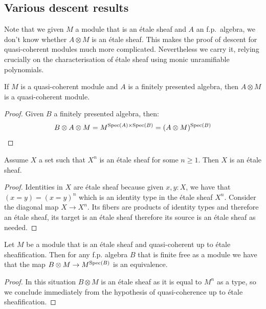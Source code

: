 \subsection{Various descent results}

Note that we given $M$ a module that is an \'etale sheaf and $A$ an f.p.\ algebra, we don't know whether $A\otimes M$ is an \'etale sheaf. This makes the proof of descent for quasi-coherent modules much more complicated. Nevertheless we carry it, relying crucially on the characterisation of \'etale sheaf using monic unramifiable polynomials.  

\begin{lemma}\label{quasicoherent-power}
If $M$ is a quasi-coherent module and $A$ is a finitely presented algebra, then $A\otimes M$ is a quasi-coherent module.
\end{lemma}

\begin{proof}
Given $B$ a finitely presented algebra, then:
\[B\otimes A\otimes M = M^{\operatorname{Spec}(A)\times\operatorname{Spec}(B)} = (A\otimes M)^{\operatorname{Spec}(B)}\]
\end{proof}

\begin{lemma}\label{sheaf-unpower}
Assume $X$ a set such that $X^n$ is an \'etale sheaf for some $n\geq 1$. Then $X$ is an \'etale sheaf.
\end{lemma}

\begin{proof}
Identities in $X$ are \'etale sheaf because given $x,y:X$, we have that $(x=y) = (x=y)^n$ which is an identity type in the \'etale sheaf $X^n$. Consider the diagonal map $X\to X^n$. Its fibers are products of identity types and therefore an \'etale sheaf, its target is an \'etale sheaf therefore its source is an \'etale sheaf as needed.
\end{proof}

\begin{lemma}\label{quasi-descent-for-quasi-coherent}
Let $M$ be a module that is an \'etale sheaf and quasi-coherent up to \'etale sheafification. Then for any f.p. algebra $B$ that is finite free as a module we have that the map $B\otimes M\to M^{\operatorname{Spec}(B)}$ is an equivalence.
\end{lemma}

\begin{proof}
In this situation $B\otimes M$ is an \'etale sheaf as it is equal to $M^n$ as a type, so we conclude immediately from the hypothesis of quasi-coherence up to \'etale sheafification.
\end{proof}

